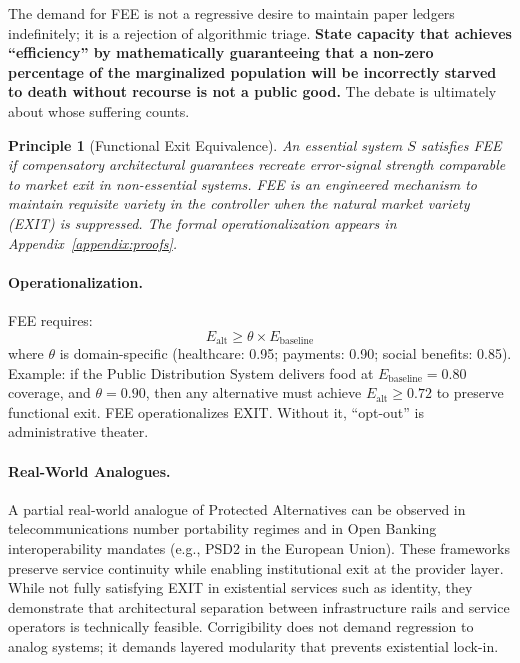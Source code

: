 \documentclass{article}
\newtheorem{principle}{Principle}
\begin{document}
The demand for FEE is not a regressive desire to maintain paper ledgers indefinitely; it is a rejection of algorithmic triage. \textbf{State capacity that achieves ``efficiency'' by mathematically guaranteeing that a non-zero percentage of the marginalized population will be incorrectly starved to death without recourse is not a public good.} The debate is ultimately about whose suffering counts.

\begin{principle}[Functional Exit Equivalence]
An essential system $S$ satisfies FEE if compensatory architectural guarantees recreate error-signal strength comparable to market exit in non-essential systems. FEE is an engineered mechanism to maintain requisite variety in the controller when the natural market variety (EXIT) is suppressed. The formal operationalization appears in Appendix~\ref{appendix:proofs}.
\end{principle}

\paragraph{Operationalization.} FEE requires:
\begin{equation}
E_{\text{alt}} \geq \theta \times E_{\text{baseline}}
\end{equation}
where $\theta$ is domain-specific (healthcare: 0.95; payments: 0.90; social benefits: 0.85). Example: if the Public Distribution System delivers food at $E_{\text{baseline}} = 0.80$ coverage, and $\theta = 0.90$, then any alternative must achieve $E_{\text{alt}} \geq 0.72$ to preserve functional exit. FEE operationalizes EXIT. Without it, ``opt-out'' is administrative theater.

\paragraph{Real-World Analogues.} A partial real-world analogue of Protected Alternatives can be observed in telecommunications number portability regimes and in Open Banking interoperability mandates (e.g., PSD2 in the European Union). These frameworks preserve service continuity while enabling institutional exit at the provider layer. While not fully satisfying EXIT in existential services such as identity, they demonstrate that architectural separation between infrastructure rails and service operators is technically feasible. Corrigibility does not demand regression to analog systems; it demands layered modularity that prevents existential lock-in.
\end{document}
